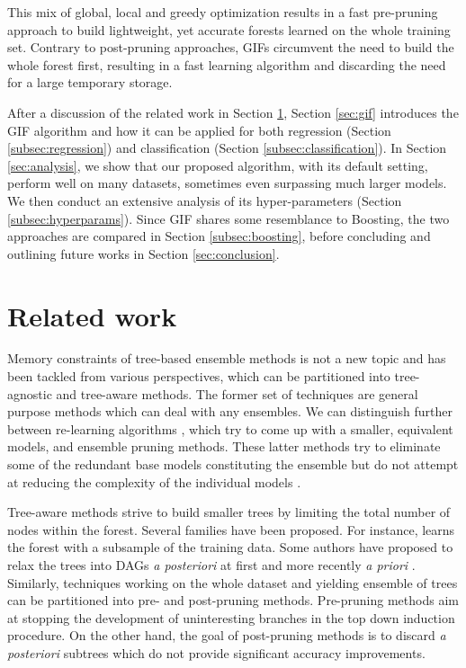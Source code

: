 \documentclass{article}
\begin{document}
This mix of global, local and greedy optimization results in a fast pre-pruning 
approach to build lightweight, yet accurate forests learned on the whole 
training set. Contrary to post-pruning approaches, GIFs circumvent the need to 
build the whole forest first, resulting in a fast learning algorithm and 
discarding the need for a large temporary storage.

After a discussion of the related work in Section \ref{sec:relatedWork},
Section \ref{sec:gif} introduces the GIF algorithm and how it can be applied
for both regression (Section \ref{subsec:regression}) and classification
(Section \ref{subsec:classification}).  In Section \ref{sec:analysis}, we show
that our proposed algorithm, with its default setting, perform well
on many datasets, sometimes even surpassing much larger models. We then conduct
an extensive analysis of its hyper-parameters (Section
\ref{subsec:hyperparams}). Since GIF shares some resemblance to Boosting, the
two approaches are compared in Section \ref{subsec:boosting}, before concluding
and outlining future works in Section \ref{sec:conclusion}.


\section{Related work}
\label{sec:relatedWork}
Memory constraints of tree-based ensemble methods is not a new topic and has
been tackled from various perspectives, which can be partitioned into
tree-agnostic and tree-aware methods. The former set of techniques are general
purpose methods which can deal with any ensembles. We can distinguish further
between re-learning algorithms
\citep[e.g.][]{domingos1997oracle,menke2009oracle}, which try to come up with a
smaller, equivalent models, and ensemble pruning methods. These latter methods
try to eliminate some of the redundant base models constituting the ensemble but
do not attempt at reducing the complexity of the individual models \citep[see ][
  for a review of these methods]{tsoumakas2008enspruning,rokach2016enspruning}.

Tree-aware methods strive to build smaller trees by limiting the total number
of nodes within the forest. Several families have been proposed. For instance,
\citet{breiman1999pasting} learns the forest with a subsample of the training
data. Some authors have proposed to relax the trees into DAGs {\it a
  posteriori} at first \citep[e.g.,][]{peterson2009dag} and more recently {\it
  a priori} \cite{shotton2013jungle}.  Similarly, techniques working on the
whole dataset and yielding ensemble of trees can be partitioned into pre- and
post-pruning methods. Pre-pruning methods aim at stopping the development of
uninteresting branches in the top down induction procedure. On the other hand,
the goal of post-pruning methods is to discard {\it a posteriori} subtrees which
do not provide significant accuracy improvements.
\end{document}
